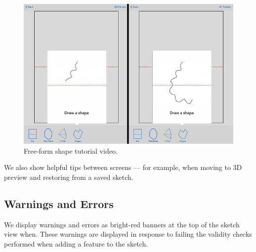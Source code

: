 \begin{figure}[htbp]
\centering
\includegraphics{figures/32_UI_Tool_Interactions/tutorial_step_one_two.png}
\caption{Free-form shape tutorial video.}
\end{figure}

We also show helpful tips between screens --- for example, when moving
to 3D preview and restoring from a saved sketch.

\subsection{Warnings and Errors}\label{warnings-and-errors}

We display warnings and errors as bright-red banners at the top of the
sketch view when. These warnings are displayed in response to failing
the validity checks performed when adding a feature to the sketch.

